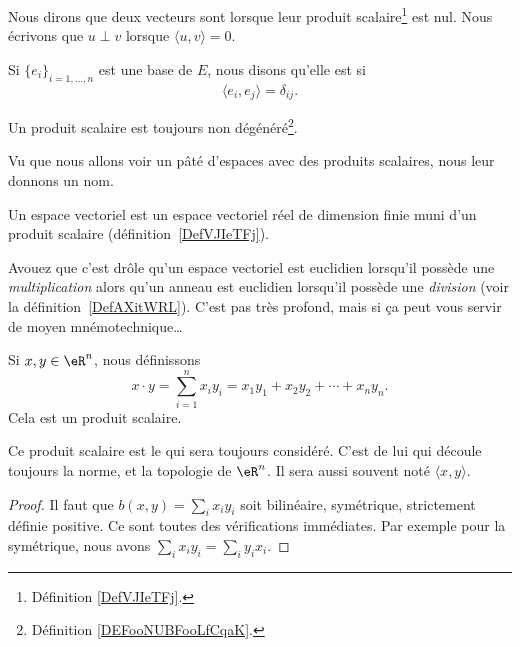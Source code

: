 \begin{definition}      \label{DEFooZBWTooIqXwRp}
	Nous dirons que deux vecteurs sont  lorsque leur produit scalaire\footnote{Définition \ref{DefVJIeTFj}.} est nul. Nous écrivons que \( u\perp v\) lorsque \( \langle u, v\rangle =0\).

	Si \( \{ e_i \}_{i=1,\ldots, n}\) est une base de \( E\), nous disons qu'elle est  si
	\begin{equation}
		\langle e_i, e_j\rangle =\delta_{ij}.
	\end{equation}
\end{definition}

\begin{lemma}       \label{LEMooLPUFooVCvnwW}
	Un produit scalaire est toujours non dégénéré\footnote{Définition \ref{DEFooNUBFooLfCqaK}.}.
\end{lemma}


Vu que nous allons voir un pâté d'espaces avec des produits scalaires, nous leur donnons un nom.
\begin{definition}\label{DefLZMcvfj}
	Un espace vectoriel  est un espace vectoriel réel de dimension finie muni d'un produit scalaire (définition~\ref{DefVJIeTFj}).
\end{definition}
Avouez que c'est drôle qu'un espace vectoriel est euclidien lorsqu'il possède une \emph{multiplication} alors qu'un anneau est euclidien lorsqu'il possède une \emph{division} (voir la définition~\ref{DefAXitWRL}). C'est pas très profond, mais si ça peut vous servir de moyen mnémotechnique\ldots

\begin{propositionDef}     \label{PROPooSKVRooDGVCYj}
	Si \( x,y\in \eR^n\), nous définissons
	\begin{equation}        \label{EQooFITHooEXDCGd}
		x\cdot y=\sum_{i=1}^n x_iy_i =x_1y_1+x_2y_2+\cdots+x_ny_n.
	\end{equation}
	Cela est un produit scalaire.

	Ce produit scalaire est le  qui sera toujours considéré. C'est de lui qui découle toujours la norme, et la topologie de \( \eR^n\). Il sera aussi souvent noté \( \langle x, y\rangle \).
\end{propositionDef}

\begin{proof}
	Il faut que \( b(x,y)=\sum_ix_iy_i\) soit bilinéaire, symétrique, strictement définie positive. Ce sont toutes des vérifications immédiates. Par exemple pour la symétrique, nous avons \( \sum_{i}x_iy_i=\sum_iy_ix_i\).
\end{proof}


